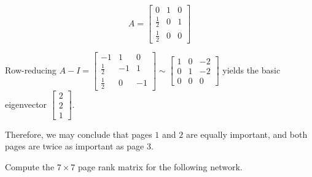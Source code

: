 \begin{applicationActivities}
\begin{activity}{10}
\begin{multicols}{2}
\[
  A
    =
  \begin{bmatrix}
    0 & 1 & 0 \\
    \frac{1}{2} & 0 & 1 \\
    \frac{1}{2} & 0 & 0
  \end{bmatrix}
\]
\end{multicols}
\end{activity}

\begin{observation}
Row-reducing
\(
  A-I
    =
  \begin{bmatrix}
    -1 & 1 & 0 \\
    \frac{1}{2} & -1 & 1 \\
    \frac{1}{2} & 0 & -1
  \end{bmatrix}
    \sim
  \begin{bmatrix}
    1 & 0 & -2 \\
    0 & 1 & -2 \\
    0 & 0 & 0
  \end{bmatrix}
\)
yields the basic eigenvector \(\begin{bmatrix} 2 \\ 2 \\1 \end{bmatrix}\).

Therefore, we may conclude that pages \(1\) and \(2\) are equally important,
and both pages are twice as important as page \(3\).
\begin{center}
\end{center}
\end{observation}


\begin{activity}{5}
Compute the $7 \times 7$ page rank matrix for the following network.
\begin{center}
\end{center}
\end{activity}
\end{applicationActivities}
